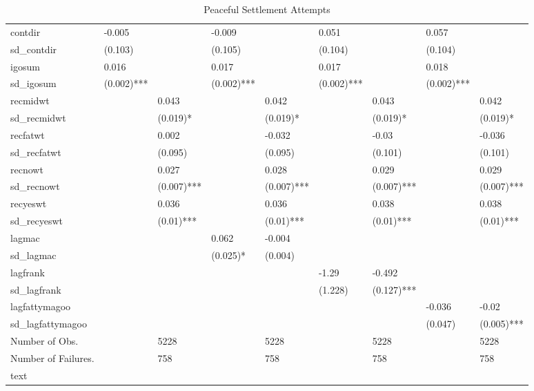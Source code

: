 \begin{table}[ht]
\begin{tabular}{lllllllll}
  contdir & -0.005 &  & -0.009 &  & 0.051 &  & 0.057 &  \\ 
  sd\_contdir & (0.103)  &  & (0.105)  &  & (0.104)  &  & (0.104)  &  \\ 
  igosum & 0.016 &  & 0.017 &  & 0.017 &  & 0.018 &  \\ 
  sd\_igosum & (0.002)*** &  & (0.002)*** &  & (0.002)*** &  & (0.002)*** &  \\ 
  recmidwt &  & 0.043 &  & 0.042 &  & 0.043 &  & 0.042 \\ 
  sd\_recmidwt &  & (0.019)* &  & (0.019)* &  & (0.019)* &  & (0.019)* \\ 
  recfatwt &  & 0.002 &  & -0.032 &  & -0.03 &  & -0.036 \\ 
  sd\_recfatwt &  & (0.095)  &  & (0.095)  &  & (0.101)  &  & (0.101)  \\ 
  recnowt &  & 0.027 &  & 0.028 &  & 0.029 &  & 0.029 \\ 
  sd\_recnowt &  & (0.007)*** &  & (0.007)*** &  & (0.007)*** &  & (0.007)*** \\ 
  recyeswt &  & 0.036 &  & 0.036 &  & 0.038 &  & 0.038 \\ 
  sd\_recyeswt &  & (0.01)*** &  & (0.01)*** &  & (0.01)*** &  & (0.01)*** \\ 
  lagmac &  &  & 0.062 & -0.004 &  &  &  &  \\ 
  sd\_lagmac &  &  & (0.025)* & (0.004)  &  &  &  &  \\ 
  lagfrank &  &  &  &  & -1.29 & -0.492 &  &  \\ 
  sd\_lagfrank &  &  &  &  & (1.228)  & (0.127)*** &  &  \\ 
  lagfattymagoo &  &  &  &  &  &  & -0.036 & -0.02 \\ 
  sd\_lagfattymagoo &  &  &  &  &  &  & (0.047)  & (0.005)*** \\ 
  Number of Obs. &  & 5228 &  & 5228 &  & 5228 &  & 5228 \\ 
  Number of Failures. &  & 758 &  & 758 &  & 758 &  & 758 \\ 
   \hline \footnotesize{ text }
\end{tabular}
\caption{Peaceful Settlement Attempts} 
\end{table}
